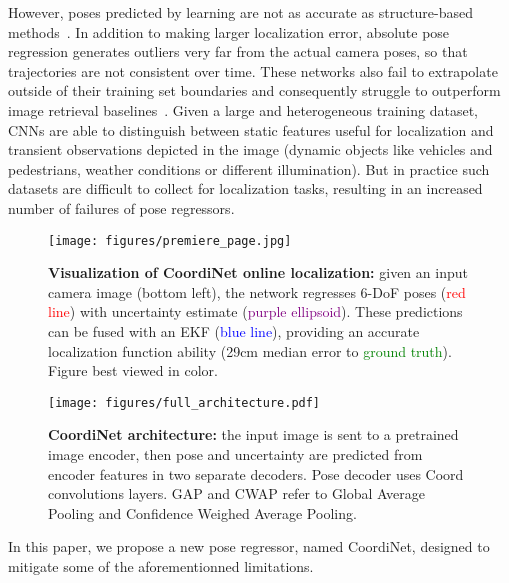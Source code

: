 \documentclass[10pt,twocolumn,letterpaper]{article}
\begin{document}
However, poses predicted by learning are not as accurate as structure-based methods~\cite{Sattler2018}. In addition to making larger localization error, absolute pose regression generates outliers very far from the actual camera poses, so that trajectories are not consistent over time. These networks also fail to extrapolate outside of their training set boundaries and consequently struggle to outperform image retrieval baselines~\cite{Sattler2019}. Given a large and heterogeneous training dataset, CNNs are able to distinguish between static features useful for localization and transient observations depicted in the image (dynamic objects like vehicles and pedestrians, weather conditions or different illumination). But in practice such datasets are difficult to collect for localization tasks, resulting in an increased number of failures of pose regressors.



\begin{figure}[t]
    \begin{center}
        \texttt{[image: figures/premiere\_page.jpg]}
    \end{center}
    \caption{\textbf{Visualization of CoordiNet online localization:} given an input camera image (bottom left), the network regresses 6-DoF poses (\textcolor{red}{red line}) with uncertainty estimate (\textcolor{purple}{purple ellipsoid}). These predictions can be fused with an EKF (\textcolor{blue}{blue line}), providing an accurate localization function ability (29cm median error to \textcolor{green}{ground truth}). Figure best viewed in color.}\label{fig:demo}
\end{figure}

\begin{figure*}[t!]
    \begin{center}
        \texttt{[image: figures/full\_architecture.pdf]}
    \end{center}
    \caption[fig:CoordiNet architecture]{\textbf{CoordiNet architecture:} the input image is sent to a pretrained image encoder, then pose and uncertainty are predicted from encoder features in two separate decoders. Pose decoder uses Coord convolutions layers. GAP and CWAP refer to Global Average Pooling and Confidence Weighed Average Pooling.}\label{coordinet}
\end{figure*}

In this paper, we propose a new pose regressor, named CoordiNet, designed to mitigate some of the aforementionned limitations.
\end{document}
